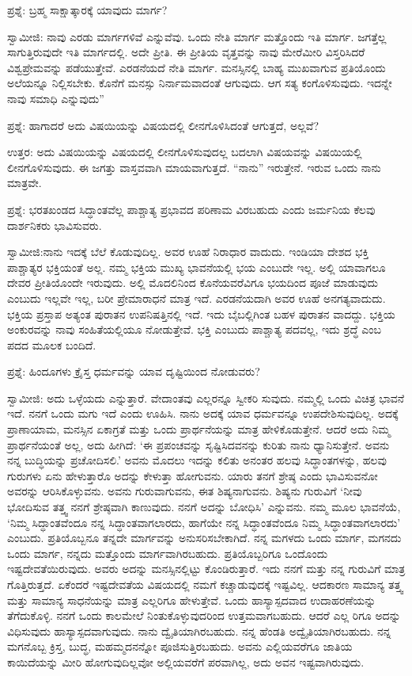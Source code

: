 ಪ್ರಶ್ನೆ: ಬ್ರಹ್ಮ ಸಾಕ್ಷಾತ್ಕಾರಕ್ಕೆ ಯಾವುದು ಮಾರ್ಗ?

ಸ್ವಾಮೀಜಿ: ನಾವು ಎರಡು ಮಾರ್ಗಗಳಿವೆ ಎನ್ನುವೆವು. ಒಂದು ನೇತಿ ಮಾರ್ಗ ಮತ್ತೊಂದು ಇತಿ ಮಾರ್ಗ. ಜಗತ್ತೆಲ್ಲ ಸಾಗುತ್ತಿರುವುದೇ ಇತಿ ಮಾರ್ಗದಲ್ಲಿ. ಅದೇ ಪ್ರೀತಿ. ಈ ಪ್ರೀತಿಯ ವೃತ್ತವನ್ನು ನಾವು ಮೇರೆಮೀರಿ ವಿಸ್ತರಿಸಿದರೆ ವಿಶ್ವಪ್ರೇಮವನ್ನು ಪಡೆಯುತ್ತೇವೆ. ಎರಡನೆಯದೆ ನೇತಿ ಮಾರ್ಗ. ಮನಸ್ಸಿನಲ್ಲಿ ಬಾಹ್ಯ ಮುಖವಾಗುವ ಪ್ರತಿಯೊಂದು ಅಲೆಯನ್ನೂ ನಿಲ್ಲಿಸಬೇಕು. ಕೊನೆಗೆ ಮನಸ್ಸು ನಿರ್ನಾಮವಾದಂತೆ ಆಗುವುದು. ಆಗ ಸತ್ಯ ಕಂಗೊಳಿಸುವುದು. ಇದನ್ನೇ ನಾವು ಸಮಾಧಿ ಎನ್ನುವುದು”

ಪ್ರಶ್ನೆ: ಹಾಗಾದರೆ ಅದು ವಿಷಯಿಯನ್ನು ವಿಷಯದಲ್ಲಿ ಲೀನಗೊಳಿಸಿದಂತೆ ಆಗುತ್ತದೆ, ಅಲ್ಲವೆ?

ಉತ್ತರ: ಅದು ವಿಷಯಿಯನ್ನು ವಿಷಯದಲ್ಲಿ ಲೀನಗೊಳಿಸುವುದಲ್ಲ ಬದಲಾಗಿ ವಿಷಯವನ್ನು ವಿಷಯಿಯಲ್ಲಿ ಲೀನಗೊಳಿಸುವುದು. ಈ ಜಗತ್ತು ವಾಸ್ತವವಾಗಿ ಮಾಯವಾಗುತ್ತದೆ. “ನಾನು” ಇರುತ್ತೇನೆ. ಇರುವ ಒಂದು ನಾನು ಮಾತ್ರವೇ.

ಪ್ರಶ್ನೆ: ಭರತಖಂಡದ ಸಿದ್ಧಾಂತವೆಲ್ಲ ಪಾಶ್ಚಾತ್ಯ ಪ್ರಭಾವದ ಪರಿಣಾಮ ವಿರಬಹುದು ಎಂದು ಜರ್ಮನಿಯ ಕೆಲವು ದಾರ್ಶನಿಕರು ಭಾವಿಸುವರು.

ಸ್ವಾಮೀಜಿ:ನಾನು ಇದಕ್ಕೆ ಬೆಲೆ ಕೊಡುವುದಿಲ್ಲ. ಅವರ ಊಹೆ ನಿರಾಧಾರ ವಾದುದು. ಇಂಡಿಯಾ ದೇಶದ ಭಕ್ತಿ ಪಾಶ್ಚಾತ್ಯರ ಭಕ್ತಿಯಂತೆ ಅಲ್ಲ. ನಮ್ಮ ಭಕ್ತಿಯ ಮುಖ್ಯ ಭಾವನೆಯಲ್ಲಿ ಭಯ ಎಂಬುದೇ ಇಲ್ಲ. ಅಲ್ಲಿ ಯಾವಾಗಲೂ ದೇವರ ಪ್ರೀತಿಯೊಂದೇ ಇರುವುದು. ಅಲ್ಲಿ ಮೊದಲಿನಿಂದ ಕೊನೆಯವರೆವಿಗೂ ಭಯದಿಂದ ಪೂಜೆ ಮಾಡುವುದು ಎಂಬುದು ಇಲ್ಲವೇ ಇಲ್ಲ, ಬರೀ ಪ್ರೇಮಾರಾಧನೆ ಮಾತ್ರ ಇದೆ. ಎರಡನೆಯದಾಗಿ ಅವರ ಊಹೆ ಅನಗತ್ಯವಾದುದು. ಭಕ್ತಿಯ ಪ್ರಸ್ತಾಪ ಅತ್ಯಂತ ಪುರಾತನ ಉಪನಿಷತ್ತಿನಲ್ಲಿ ಇದೆ. ಇದು ಬೈಬಲ್ಲಿಗಿಂತ ಬಹಳ ಪುರಾತನ ವಾದದ್ದು. ಭಕ್ತಿಯ ಅಂಕುರವನ್ನು ನಾವು ಸಂಹಿತೆಯಲ್ಲಿಯೂ ನೋಡುತ್ತೇವೆ. ಭಕ್ತಿ ಎಂಬುದು ಪಾಶ್ಚಾತ್ಯ ಪದವಲ್ಲ, ಇದು ಶ್ರದ್ಧೆ ಎಂಬ ಪದದ ಮೂಲಕ ಬಂದಿದೆ.

ಪ್ರಶ್ನೆ: ಹಿಂದೂಗಳು ಕ್ರೈಸ್ತ ಧರ್ಮವನ್ನು ಯಾವ ದೃಷ್ಟಿಯಿಂದ ನೋಡುವರು?

ಸ್ವಾಮೀಜಿ: ಅದು ಒಳ್ಳೆಯದು ಎನ್ನುತ್ತಾರೆ. ವೇದಾಂತವು ಎಲ್ಲರನ್ನೂ ಸ್ವೀಕರಿ ಸುವುದು. ನಮ್ಮಲ್ಲಿ ಒಂದು ವಿಚಿತ್ರ ಭಾವನೆ ಇದೆ. ನನಗೆ ಒಂದು ಮಗು ಇದೆ ಎಂದು ಊಹಿಸಿ. ನಾನು ಅದಕ್ಕೆ ಯಾವ ಧರ್ಮವನ್ನೂ ಉಪದೇಶಿಸುವುದಿಲ್ಲ. ಅದಕ್ಕೆ ಪ್ರಾಣಾಯಾಮ, ಮನಸ್ಸಿನ ಏಕಾಗ್ರತೆ ಮತ್ತು ಒಂದು ಪ್ರಾರ್ಥನೆಯನ್ನು ಮಾತ್ರ ಹೇಳಿಕೊಡುತ್ತೇನೆ. ಆದರೆ ಅದು ನಿಮ್ಮ ಪ್ರಾರ್ಥನೆಯಂತೆ ಅಲ್ಲ, ಅದು ಹೀಗಿದೆ: ‘ಈ ಪ್ರಪಂಚವನ್ನು ಸೃಷ್ಟಿಸಿದವನನ್ನು ಕುರಿತು ನಾನು ಧ್ಯಾನಿಸುತ್ತೇನೆ. ಅವನು ನನ್ನ ಬುದ್ಧಿಯನ್ನು ಪ್ರಚೋದಿಸಲಿ.’ ಅವನು ಮೊದಲು ಇದನ್ನು ಕಲಿತು ಅನಂತರ ಹಲವು ಸಿದ್ಧಾಂತಗಳನ್ನು, ಹಲವು ಗುರುಗಳು ಏನು ಹೇಳುತ್ತಾರೊ ಅದನ್ನು ಕೇಳುತ್ತಾ ಹೋಗುವನು. ಯಾರು ತನಗೆ ಶ್ರೇಷ್ಠ ಎಂದು ಭಾವಿಸುವನೋ ಅವರನ್ನು ಆರಿಸಿಕೊಳ್ಳುವನು. ಅವನು ಗುರುವಾಗುವನು, ಈತ ಶಿಷ್ಯನಾಗುವನು. ಶಿಷ್ಯನು ಗುರುವಿಗೆ ‘ನೀವು ಭೋದಿಸುವ ತತ್ತ್ವ ನನಗೆ ಶ್ರೇಷ್ಠವಾಗಿ ಕಾಣುವುದು. ನನಗೆ ಅದನ್ನು ಬೋಧಿಸಿ’ ಎನ್ನುವನು. ನಮ್ಮ ಮೂಲ ಭಾವನೆಯೆ, ‘ನಿಮ್ಮ ಸಿದ್ಧಾಂತವೆಂದೂ ನನ್ನ ಸಿದ್ಧಾಂತವಾಗಲಾರದು, ಹಾಗೆಯೇ ನನ್ನ ಸಿದ್ಧಾಂತವೆಂದೂ ನಿಮ್ಮ ಸಿದ್ಧಾಂತವಾಗಲಾರದು’ ಎಂಬುದು. ಪ್ರತಿಯೊಬ್ಬನೂ ತನ್ನದೇ ಮಾರ್ಗವನ್ನು ಅನುಸರಿಸಬೇಕಾಗಿದೆ. ನನ್ನ ಮಗಳದು ಒಂದು ಮಾರ್ಗ, ಮಗನದು ಒಂದು ಮಾರ್ಗ, ನನ್ನದು ಮತ್ತೊಂದು ಮಾರ್ಗವಾಗಿರಬಹುದು. ಪ್ರತಿಯೊಬ್ಬರಿಗೂ ಒಂದೊಂದು ಇಷ್ಟದೇವತೆಯಿರುವುದು. ಅವರು ಅದನ್ನು ಮನಸ್ಸಿನಲ್ಲಿಟ್ಟು ಕೊಂಡಿರುತ್ತಾರೆ. ಇದು ನನಗೆ ಮತ್ತು ನನ್ನ ಗುರುವಿಗೆ ಮಾತ್ರ ಗೊತ್ತಿರುತ್ತದೆ. ಏಕೆಂದರೆ ಇಷ್ಟದೇವತೆಯ ವಿಷಯದಲ್ಲಿ ನಮಗೆ ಕಚ್ಚಾಡುವುದಕ್ಕೆ ಇಷ್ಟವಿಲ್ಲ. ಆದಕಾರಣ ಸಾಮಾನ್ಯ ತತ್ತ್ವ ಮತ್ತು ಸಾಮಾನ್ಯ ಸಾಧನೆಯನ್ನು ಮಾತ್ರ ಎಲ್ಲರಿಗೂ ಹೇಳುತ್ತೇವೆ. ಒಂದು ಹಾಸ್ಯಾಸ್ಪದವಾದ ಉದಾಹರಣೆಯನ್ನು ತೆಗೆದುಕೊಳ್ಳಿ. ನನಗೆ ಒಂದು ಕಾಲಮೇಲೆ ನಿಂತುಕೊಳ್ಳುವುದರಿಂದ ಉತ್ತಮವಾಗಬಹುದು. ಆದರೆ ಎಲ್ಲ ರಿಗೂ ಅದನ್ನು ವಿಧಿಸುವುದು ಹಾಸ್ಯಾಸ್ಪದವಾಗುವುದು. ನಾನು ದ್ವೈತಿಯಾಗಿರಬಹುದು. ನನ್ನ ಹೆಂಡತಿ ಅದ್ವೈತಿಯಾಗಿರಬಹುದು. ನನ್ನ ಮಗನೊಬ್ಬ ಕ್ರಿಸ್ತ, ಬುದ್ಧ, ಮಹಮ್ಮದನನ್ನೋ ಪೂಜಿಸುತ್ತಿರಬಹುದು. ಅವನು ಎಲ್ಲಿಯವರೆಗೂ ಜಾತಿಯ ಕಾಯಿದೆಯನ್ನು ಮೀರಿ ಹೋಗುವುದಿಲ್ಲವೋ ಅಲ್ಲಿಯವರೆಗೆ ಪರವಾಗಿಲ್ಲ, ಅದು ಅವನ ಇಷ್ಟವಾಗಿರುವುದು.

